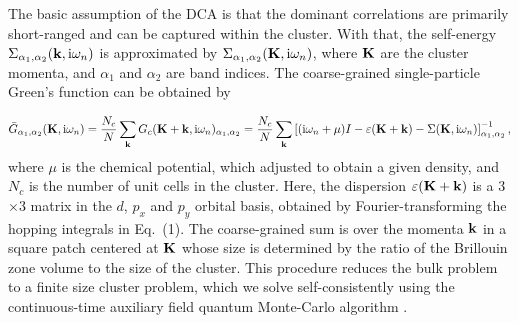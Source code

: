 \documentclass[reprint,nofootinbib,nobibnotes,amsmath,amssymb,aps,prb,floatfix]{revtex4-1}
\newcommand{\beq}{\begin{equation}}
\newcommand{\eeq}{\end{equation}}
\begin{document}
The basic assumption of the DCA is that the dominant correlations are  primarily short-ranged and can be captured within the cluster. With that, the self-energy $\Sigma_{\alpha_1,\alpha_2}({\bf k},\text{i} \omega_n)$ is approximated by $\Sigma_{\alpha_1,\alpha_2}({\bf K},\text{i} \omega_n)$, where ${\bf K}$ are the cluster momenta, and $\alpha_1$ and $\alpha_2$ are band indices. The coarse-grained single-particle Green's function can be obtained by 
\begin{widetext}
\beq
\bar{G}_{\alpha_1,\alpha_2}({\bf K},\text{i}\omega_n)=\frac{N_c}{N}\sum_{\bf{k}}G_c({\bf K}+{\bf k},\text{i}\omega_n)_{\alpha_1,\alpha_2}=\frac{N_c}{N}\sum_{\bf{k}}\left[(\text{i}\omega_n+\mu)I-\varepsilon({\bf K}+{\bf k})-\Sigma({\bf K},\text{i}\omega_n)\right]^{-1}_{\alpha_1,\alpha_2},
\eeq
where $\mu$ is the chemical potential, which adjusted to obtain a given density, and $N_c$ is the number of unit cells in the cluster. Here, the dispersion $\varepsilon({\bf K+k})$ is a 3$\times$3 matrix in the $d$, $p_x$ and $p_y$ orbital basis, obtained by Fourier-transforming the hopping integrals in Eq.~(1). The coarse-grained sum is over the momenta $\bf{k}$ in a square patch centered at ${\bf K}$ whose size is determined by the ratio of the Brillouin zone volume to the size of the cluster. This procedure reduces the bulk problem to a finite size cluster problem, which we solve self-consistently using the continuous-time auxiliary field quantum Monte-Carlo algorithm \cite{Gull}. 


\end{widetext}
\end{document}
